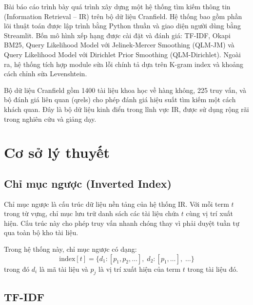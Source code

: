 \documentclass[12pt,a4paper,twoside]{article}
\begin{document}
Bài báo cáo trình bày quá trình xây dựng một hệ thống tìm kiếm thông tin (Information Retrieval -- IR) trên bộ dữ liệu Cranfield. Hệ thống bao gồm phần lõi thuật toán được lập trình bằng Python thuần và giao diện người dùng bằng Streamlit. Bốn mô hình xếp hạng được cài đặt và đánh giá: TF-IDF, Okapi BM25, Query Likelihood Model với Jelinek-Mercer Smoothing (QLM-JM) và Query Likelihood Model với Dirichlet Prior Smoothing (QLM-Dirichlet). Ngoài ra, hệ thống tích hợp module sửa lỗi chính tả dựa trên K-gram index và khoảng cách chỉnh sửa Levenshtein.

Bộ dữ liệu Cranfield gồm 1400 tài liệu khoa học về hàng không, 225 truy vấn, và bộ đánh giá liên quan (qrels) cho phép đánh giá hiệu suất tìm kiếm một cách khách quan. Đây là bộ dữ liệu kinh điển trong lĩnh vực IR, được sử dụng rộng rãi trong nghiên cứu và giảng dạy.

\section{Cơ sở lý thuyết}

\subsection{Chỉ mục ngược (Inverted Index)}

Chỉ mục ngược là cấu trúc dữ liệu nền tảng của hệ thống IR. Với mỗi term $t$ trong từ vựng, chỉ mục lưu trữ danh sách các tài liệu chứa $t$ cùng vị trí xuất hiện. Cấu trúc này cho phép truy vấn nhanh chóng thay vì phải duyệt tuần tự qua toàn bộ kho tài liệu.

Trong hệ thống này, chỉ mục ngược có dạng:
\[
\text{index}[t] = \{d_1: [p_1, p_2, \ldots], \; d_2: [p_1, \ldots], \; \ldots\}
\]
trong đó $d_i$ là mã tài liệu và $p_j$ là vị trí xuất hiện của term $t$ trong tài liệu đó.

\subsection{TF-IDF}
\end{document}
